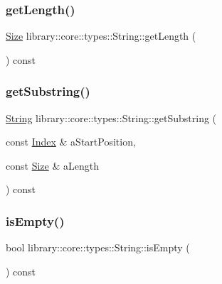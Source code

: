 \subsubsection{\texorpdfstring{get\+Length()}{getLength()}}
{\footnotesize\ttfamily \hyperlink{namespacelibrary_1_1core_1_1types_a701626ea1027888ebbb8cfd0ff7adab0}{Size} library\+::core\+::types\+::\+String\+::get\+Length (\begin{DoxyParamCaption}{ }\end{DoxyParamCaption}) const}

\mbox{\label{classlibrary_1_1core_1_1types_1_1_string_aaf9377048b900766d05a1af9182cf251}} 
\subsubsection{\texorpdfstring{get\+Substring()}{getSubstring()}}
{\footnotesize\ttfamily \hyperlink{classlibrary_1_1core_1_1types_1_1_string}{String} library\+::core\+::types\+::\+String\+::get\+Substring (\begin{DoxyParamCaption}\item[{const \hyperlink{namespacelibrary_1_1core_1_1types_ad87eeb821d7067ec94e06ed1980d6350}{Index} \&}]{a\+Start\+Position,  }\item[{const \hyperlink{namespacelibrary_1_1core_1_1types_a701626ea1027888ebbb8cfd0ff7adab0}{Size} \&}]{a\+Length }\end{DoxyParamCaption}) const}

\mbox{\label{classlibrary_1_1core_1_1types_1_1_string_a1981fee5619389b46c786afa7aadc251}} 
\subsubsection{\texorpdfstring{is\+Empty()}{isEmpty()}}
{\footnotesize\ttfamily bool library\+::core\+::types\+::\+String\+::is\+Empty (\begin{DoxyParamCaption}{ }\end{DoxyParamCaption}) const}

